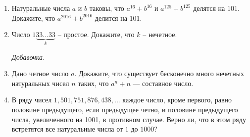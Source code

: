\begin{enumerate}
\item Натуральные числа $a$ и $b$ таковы, что $a^{16}+b^{16}$ и $a^{125}+b^{125}$ делятся на 101. Докажите, что $a^{2016}+b^{2016}$ делится на 101.

\item Число $1\underbrace{33...33}_k$ -- простое. Докажите, что $k$ -- нечетное. 

\bigskip

{\it Добавочка.}

\bigskip

\item  Дано четное число $a$. Докажите, что существует бесконечно много нечетных натуральных чисел $n$ таких, что $a^{n} + n$ — составное число.


\item В ряду чисел $1, 501, 751, 876, 438, . . .$ каждое число, кроме первого, равно половине предыдущего, если предыдущее четно, и половине предыдущего числа, увеличенного на 1001, в противном случае. Верно ли, что в этом ряду встретятся все натуральные числа от $1$ до $1000$?


\end{enumerate}